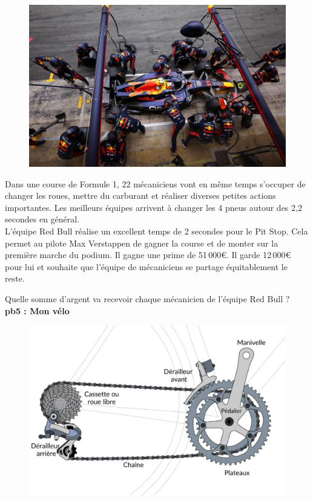 \begin{multicols}{2} 

\begin{figure}[H]
  \centering
  \includegraphics[width=0.8\linewidth]{5x2-inegalite-triangulaire/f1.png}
\end{figure}  \columnbreak

Dans une course de Formule 1, 22 mécaniciens vont en même temps s'occuper de changer les roues, mettre du carburant et réaliser diverses petites actions importantes. Les meilleurs équipes arrivent à changer les 4 pneus autour des 2,2 secondes en général. \\

L'équipe Red Bull réalise un excellent temps de 2 secondes pour le Pit Stop. Cela permet au pilote Max Verstappen de gagner la course et de monter sur la première marche du podium. Il gagne une prime de 51\,000€. Il garde 12\,000€ pour lui et souhaite que l'équipe de mécaniciens se partage équitablement le reste. \\
\end{multicols}


Quelle somme d'argent va recevoir chaque mécanicien de l'équipe Red Bull ?\\

\textbf{pb5 : Mon vélo} \\

\begin{figure}[H]
  \centering
  \includegraphics[width=0.4\linewidth]{5x2-inegalite-triangulaire/velo.jpg}
\end{figure} 

